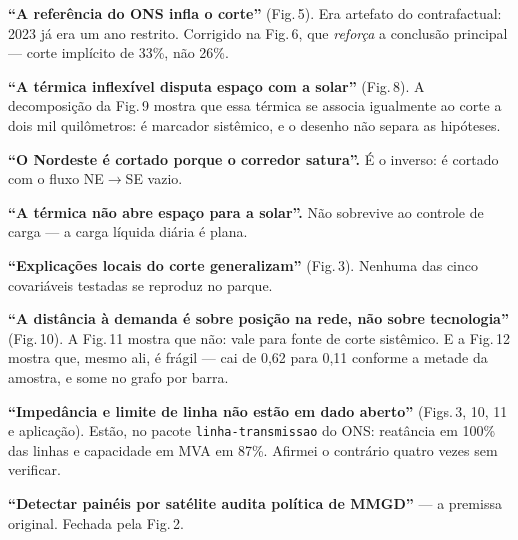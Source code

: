 \documentclass[10pt]{article}
\newcommand{\bloco}[1]{\vspace{2pt}{\color{vermelho}\footnotesize\textbf{#1}}\par\vspace{-2pt}}
\begin{document}
\begin{minipage}[t]{0.315\linewidth}\vspace{0pt}\small
\bloco{Derrubado --- inclusive por mim}
\textbf{``A referência do ONS infla o corte''} (Fig.\,5). Era artefato do
contrafactual: 2023 já era um ano restrito. Corrigido na Fig.\,6, que \textit{reforça}
a conclusão principal --- corte implícito de 33\%, não 26\%.

\textbf{``A térmica inflexível disputa espaço com a solar''} (Fig.\,8). A
decomposição da Fig.\,9 mostra que essa térmica se associa igualmente ao corte a
dois mil quilômetros: é marcador sistêmico, e o desenho não separa as hipóteses.

\textbf{``O Nordeste é cortado porque o corredor satura''.} É o inverso: é cortado
com o fluxo NE$\rightarrow$SE vazio.

\textbf{``A térmica não abre espaço para a solar''.} Não sobrevive ao controle de
carga --- a carga líquida diária é plana.

\textbf{``Explicações locais do corte generalizam''} (Fig.\,3). Nenhuma das cinco
covariáveis testadas se reproduz no parque.

\textbf{``A distância à demanda é sobre posição na rede, não sobre tecnologia''}
(Fig.\,10). A Fig.\,11 mostra que não: vale para fonte de corte sistêmico. E a
Fig.\,12 mostra que, mesmo ali, é frágil --- cai de 0,62 para 0,11 conforme a metade
da amostra, e some no grafo por barra.

\textbf{``Impedância e limite de linha não estão em dado aberto''} (Figs.\,3, 10, 11 e
aplicação). Estão, no pacote \texttt{linha-transmissao} do ONS: reatância em 100\% das
linhas e capacidade em MVA em 87\%. Afirmei o contrário quatro vezes sem verificar.

\textbf{``Detectar painéis por satélite audita política de MMGD''} --- a premissa
original. Fechada pela Fig.\,2.
\end{minipage}\hfill
\end{document}
